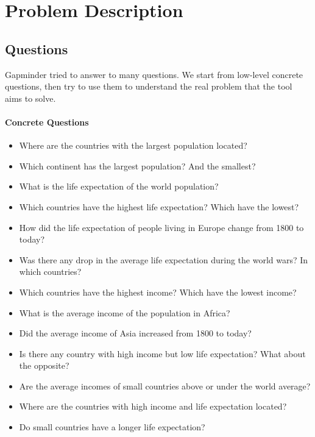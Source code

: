 \section{Problem Description}
\label{sec:problem}

\subsection{Questions}
Gapminder tried to answer to many questions.
We start from low-level concrete questions, then try to use them to understand the real problem that the tool aims to solve. 

\pagebreak

\paragraph{Concrete Questions}
\begin{itemize}

    \item Where are the countries with the largest population located?
    \item Which continent has the largest population? And the smallest?

    \item What is the life expectation of the world population?
    \item Which countries have the highest life expectation? Which have the lowest?
    \item How did the life expectation of people living in Europe change from 1800 to today?
    \item Was there any drop in the average life expectation during the world wars? In which countries?

    \item Which countries have the highest income? Which have the lowest income?
    \item What is the average income of the population in Africa?
    \item Did the average income of Asia increased from 1800 to today?  

    \item Is there any country with high income but low life expectation? What about the opposite?
    \item Are the average incomes of small countries above or under the world average?
    \item Where are the countries with high income and life expectation located?
    \item Do small countries have a longer life expectation?

\end{itemize}

